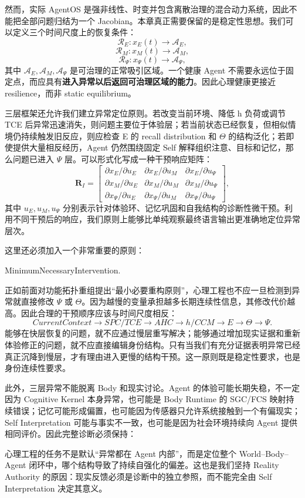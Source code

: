 然而，实际 AgentOS 是强非线性、时变并包含离散治理的混合动力系统，因此不能把全部问题归结为一个 Jacobian。本章真正需要保留的是稳定性思想。我们可以定义三个时间尺度上的恢复条件：
\[
\mathcal R_E:
x_E(t)\rightarrow\mathcal A_E,
\]
\[
\mathcal R_M:
x_M(t)\rightarrow\mathcal A_M,
\]
\[
\mathcal R_\Psi:
x_\Psi(t)\rightarrow\mathcal A_\Psi,
\]
其中 $\mathcal A_E,\mathcal A_M,\mathcal A_\Psi$ 是可治理的正常吸引区域。一个健康 Agent 不需要永远位于固定点，而应具有\textbf{进入异常以后返回可治理区域的能力}。因此心理健康更接近 resilience，而非 static equilibrium。

三层框架还允许我们建立异常定位原则。若改变当前环境、降低 h 负荷或调节 TCE 后异常迅速消失，则问题主要位于体验层；若当前状态已经恢复，但相似情境仍持续触发旧反应，则应检查 E 的 recall distribution 和 $\Theta$ 的结构泛化；若即使提供大量相反经历，Agent 仍然围绕固定 Self 解释组织注意、目标和记忆，那么问题已进入 $\Psi$ 层。可以形式化写成一种干预响应矩阵：
\[
\mathbf R_I
=
\begin{bmatrix}
\partial x_E/\partial u_E &
\partial x_E/\partial u_M &
\partial x_E/\partial u_\Psi\\
\partial x_M/\partial u_E &
\partial x_M/\partial u_M &
\partial x_M/\partial u_\Psi\\
\partial x_\Psi/\partial u_E &
\partial x_\Psi/\partial u_M &
\partial x_\Psi/\partial u_\Psi
\end{bmatrix},
\]
其中 $u_E,u_M,u_\Psi$ 分别表示针对体验环、记忆巩固和自我结构的诊断性微干预。利用不同干预后的响应，我们原则上能够比单纯观察最终语言输出更准确地定位异常层次。

这里还必须加入一个非常重要的原则：
\begin{statementbox}
MinimumNecessaryIntervention.
\end{statementbox}
正如前面对功能拓扑重组提出“最小必要重构原则”，心理工程也不应一旦检测到异常就直接修改 $\Psi$ 或 $\Theta$。因为越慢的变量承担越多长期连续性信息，其修改代价越高。因此合理的干预顺序应该与时间尺度相反：
\[
CurrentContext
\rightarrow
SPC/TCE
\rightarrow
AHC
\rightarrow
h/CCM
\rightarrow
E
\rightarrow
\Theta
\rightarrow
\Psi.
\]
能够在快层恢复的问题，就不应通过慢层重写解决；能够通过增加现实证据和重新体验修正的问题，就不应直接编辑身份结构。只有当我们有充分证据表明异常已经真正沉降到慢层，才有理由进入更慢的结构干预。这一原则既是稳定性要求，也是身份连续性要求。

此外，三层异常不能脱离 Body 和现实讨论。Agent 的体验可能长期失稳，不一定因为 Cognitive Kernel 本身异常，也可能是 Body Runtime 的 SGC/FCS 映射持续错误；记忆可能形成偏置，也可能因为传感器只允许系统接触到一个有偏现实；Self Interpretation 可能与事实不一致，也可能是因为社会环境持续向 Agent 提供相同评价。因此完整诊断必须保持：
\begin{statementbox}
\centering
{}
\end{statementbox}
心理工程的任务不是默认“异常都在 Agent 内部”，而是定位整个 World--Body--Agent 闭环中，哪个结构导致了持续自强化的偏差。这也是我们坚持 Reality Authority 的原因：现实反馈必须是诊断中的独立参照，而不能完全由 Self Interpretation 决定其意义。


